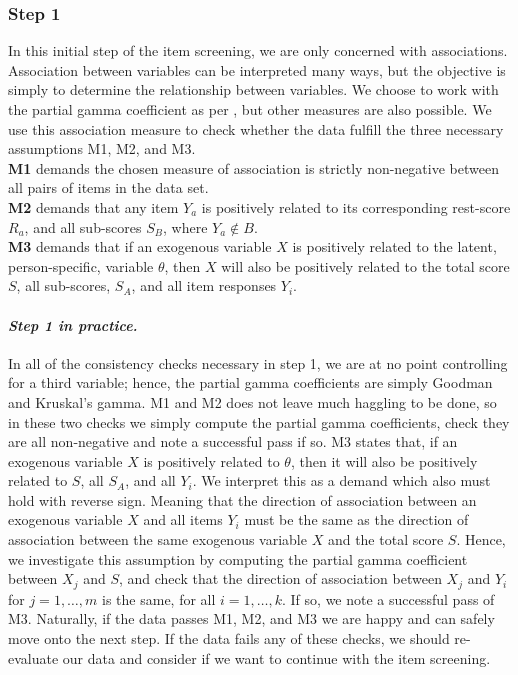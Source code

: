 \documentclass[a4project,12pt]{article}
\theoremstyle{examplestyle}
\theoremstyle{defstyle}
\theoremstyle{thmstyle}
\begin{document}
\subsubsection{Step 1} In this initial step of the item screening, we are only concerned with associations. Association between variables can be interpreted many ways, but the objective is simply to determine the relationship between variables. We choose to work with the partial gamma coefficient as per \citet{Kreiner_Christensen_2011}, but other measures are also possible. We use this association measure to check whether the data fulfill the three necessary assumptions M1, M2, and M3. \\
\textbf{M1} demands the chosen measure of association is strictly non-negative between all pairs of items in the data set. \\
\textbf{M2} demands that any item $Y_a$ is positively related to its corresponding rest-score $R_a$, and all sub-scores $S_B$, where $Y_a\not\in B$. \\
\textbf{M3} demands that if an exogenous variable $X$ is positively related to the latent, person-specific, variable $\theta$, then $X$ will also be positively related to the total score $S$, all sub-scores, $S_A$, and all item responses $Y_i$. 

\paragraph{\textit{Step 1 in practice.}} In all of the consistency checks necessary in step 1, we are at no point controlling for a third variable; hence, the partial gamma coefficients are simply Goodman and Kruskal's gamma. M1 and M2 does not leave much haggling to be done, so in these two checks we simply compute the partial gamma coefficients, check they are all non-negative and note a successful pass if so. M3 states that, if an exogenous variable $X$ is positively related to $\theta$, then it will also be positively related to $S$, all $S_A$, and all $Y_i$. We interpret this as a demand which also must hold with reverse sign. Meaning that the direction of association between an exogenous variable $X$ and all items $Y_i$ must be the same as the direction of association between the same exogenous variable $X$ and the total score $S$. Hence, we investigate this assumption by computing the partial gamma coefficient between $X_j$ and $S$, and check that the direction of association between $X_j$ and $Y_i$ for $j=1,\dots,m$ is the same, for all $i=1,\dots, k$. If so, we note a successful pass of M3. Naturally, if the data passes M1, M2, and M3 we are happy and can safely move onto the next step. If the data fails any of these checks, we should re-evaluate our data and consider if we want to continue with the item screening. 
\end{document}
